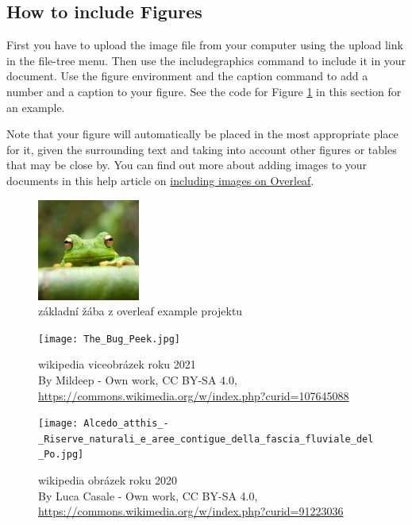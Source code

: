 \documentclass{article}
\begin{document}
\subsection{How to include Figures}

First you have to upload the image file from your computer using the upload link in the file-tree menu. Then use the includegraphics command to include it in your document. Use the figure environment and the caption command to add a number and a caption to your figure. See the code for Figure \ref{fig:frog} in this section for an example.

Note that your figure will automatically be placed in the most appropriate place for it, given the surrounding text and taking into account other figures or tables that may be close by. You can find out more about adding images to your documents in this help article on \href{https://www.overleaf.com/learn/how-to/Including_images_on_Overleaf}{including images on Overleaf}.

\begin{figure}
      \centering
      \includegraphics[width=0.3\textwidth]{frog.jpg}
      \caption{\label{fig:frog}základní žába z overleaf example projektu}
\end{figure}

\begin{figure}
      \centering
      \texttt{[image: The\_Bug\_Peek.jpg]}
      \caption{\label{fig:bug_peek}wikipedia viceobrázek roku 2021 \\ By Mildeep - Own work, CC BY-SA 4.0, \href{https://commons.wikimedia.org/w/index.php?curid=107645088}{https://commons.wikimedia.org/w/index.php?curid=107645088}}
\end{figure}

\begin{figure}
      \centering
      \texttt{[image: Alcedo\_atthis\_-\_Riserve\_naturali\_e\_aree\_contigue\_della\_fascia\_fluviale\_del\_Po.jpg]}
      \caption{\label{fig:kingfisher}wikipedia obrázek roku 2020 \\ By Luca Casale - Own work, CC BY-SA 4.0, \href{https://commons.wikimedia.org/w/index.php?curid=91223036}{https://commons.wikimedia.org/w/index.php?curid=91223036}}
\end{figure}
\end{document}
